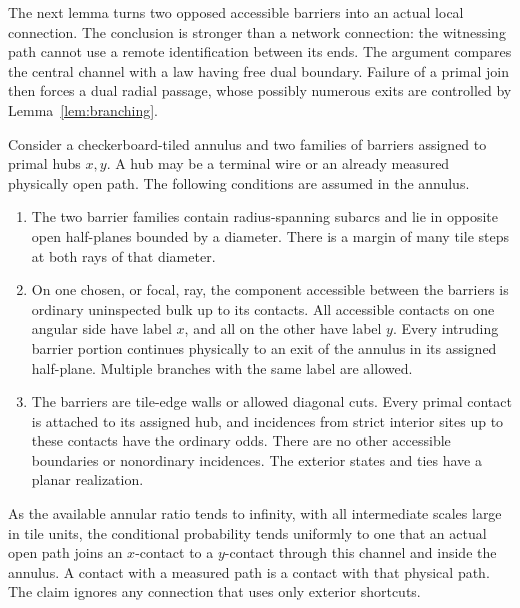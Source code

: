 The next lemma turns two opposed accessible barriers into an actual
local connection.  The conclusion is stronger than a network connection:
the witnessing path cannot use a remote identification between its ends.
The argument compares the central channel with a law having free dual
boundary. Failure of a primal join then forces a dual radial passage,
whose possibly numerous exits are controlled by Lemma~\ref{lem:branching}.

\begin{lemma}\label{lem:confined-join}
Consider a checkerboard-tiled annulus and two families of barriers
assigned to primal hubs $x,y$.  A hub may be a terminal wire or an
already measured physically open path.  The following conditions are
assumed in the annulus.
\begin{enumerate}[label=\textup{(\roman*)}]
 \item The two barrier families contain radius-spanning subarcs and
 lie in opposite open half-planes bounded by a diameter.  There is a
 margin of many tile steps at both rays of that diameter.
 \item On one chosen, or focal, ray, the component accessible between
 the barriers is ordinary uninspected bulk up to its contacts.  All
 accessible contacts on one angular side have label $x$, and all on
 the other have label $y$.  Every intruding barrier portion continues
 physically to an exit of the annulus in its assigned half-plane.
 Multiple branches with the same label are allowed.
 \item The barriers are tile-edge walls or allowed diagonal cuts.
 Every primal contact is attached to its assigned hub, and incidences
 from strict interior sites up to these contacts have the ordinary
 odds.  There are no other accessible boundaries or nonordinary
 incidences.  The exterior states and ties have a planar realization.
\end{enumerate}
As the available annular ratio tends to infinity, with all intermediate
scales large in tile units, the conditional probability tends uniformly
to one that an actual open path joins an $x$-contact to a $y$-contact
through this channel and inside the annulus.  A contact with a measured
path is a contact with that physical path.  The claim ignores any
connection that uses only exterior shortcuts.
\end{lemma}

